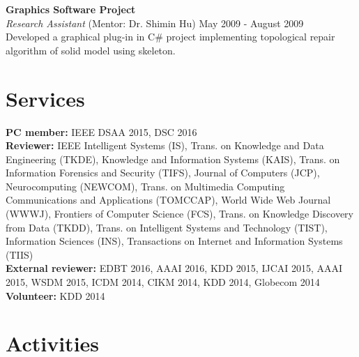 \documentclass[margin, 10pt]{res} %
\begin{document}
\begin{resume}
{\bf Graphics Software Project} \\
{\em Research Assistant} (Mentor: Dr. Shimin Hu) \hfill {May 2009 - August 2009} \\
Developed a graphical plug-in in C\# project implementing topological repair algorithm of solid model using skeleton.




\section{Services}

{\bf PC member:} IEEE DSAA 2015, DSC 2016 \\
{\bf Reviewer:} IEEE Intelligent Systems (IS), Trans. on Knowledge and Data Engineering (TKDE), 
Knowledge and Information Systems (KAIS), Trans. on Information Forensics and Security (TIFS), Journal of Computers (JCP), Neurocomputing (NEWCOM),
Trans. on Multimedia Computing Communications and Applications (TOMCCAP), World Wide Web Journal (WWWJ), Frontiers of Computer Science (FCS),
Trans. on Knowledge Discovery from Data (TKDD), Trans. on Intelligent Systems and Technology (TIST), Information Sciences (INS),
Transactions on Internet and Information Systems (TIIS) \\
{\bf External reviewer:} EDBT 2016, AAAI 2016, KDD 2015, IJCAI 2015, AAAI 2015, WSDM 2015, ICDM 2014, CIKM 2014, KDD 2014, Globecom 2014 \\
{\bf Volunteer:} KDD 2014


\section{Activities}


\end{resume}
\end{document}
